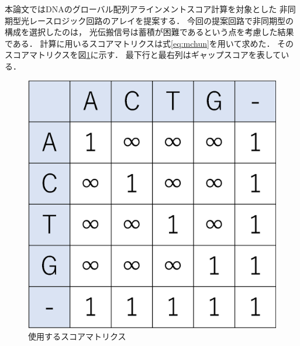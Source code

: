 本論文ではDNAのグローバル配列アラインメントスコア計算を対象とした
非同期型光レースロジック回路のアレイを提案する．
今回の提案回路で非同期型の構成を選択したのは，
光伝搬信号は蓄積が困難であるという点を考慮した結果である．
計算に用いるスコアマトリクスは式\ref{eq:mchun}を用いて求めた．
そのスコアマトリクスを図\ref{fig:scorematrix_3}に示す．
最下行と最右列はギャップスコアを表している．
\begin{figure}[t!]
\begin{center}
\includegraphics[keepaspectratio,scale=0.4]{fig/3/scorematrix.eps}
\caption{使用するスコアマトリクス}
\label{fig:scorematrix_3}
\end{center}
\end{figure}

